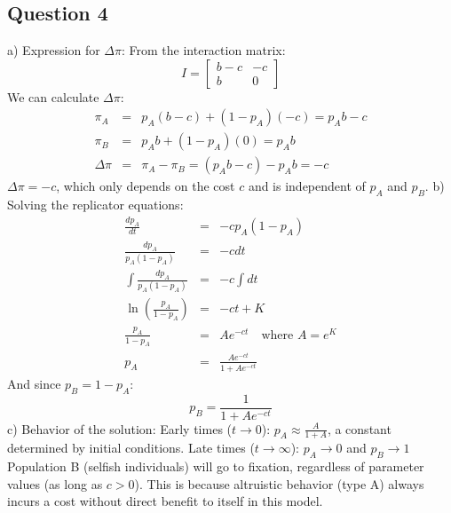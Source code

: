 \documentclass{article}
\begin{document}
\subsection{Question 4}
a) Expression for \(\Delta\pi\):
From the interaction matrix:
\[
I = \begin{bmatrix} b-c & -c \\ b & 0 \end{bmatrix}
\]
We can calculate \(\Delta\pi\):
\[
\begin{array}{rcl}
\pi_A & = & p_A(b-c) + (1-p_A)(-c) = p_A b - c \\
\pi_B & = & p_A b + (1-p_A)(0) = p_A b \\
\Delta\pi & = & \pi_A - \pi_B = (p_A b - c) - p_A b = -c
\end{array}
\]
\(\Delta\pi = -c\), which only depends on the cost \(c\) and is independent of \(p_A\) and \(p_B\).
b) Solving the replicator equations:
\[
\begin{array}{rcl}
\frac{dp_A}{dt} & = & -cp_A(1-p_A) \\
\frac{dp_A}{p_A(1-p_A)} & = & -c dt \\
\int \frac{dp_A}{p_A(1-p_A)} & = & -c \int dt \\
\ln\left(\frac{p_A}{1-p_A}\right) & = & -ct + K \\
\frac{p_A}{1-p_A} & = & Ae^{-ct} \quad \text{where \(A = e^K\)} \\
p_A & = & \frac{Ae^{-ct}}{1+Ae^{-ct}}
\end{array}
\]
And since \(p_B = 1 - p_A\):
\[
p_B = \frac{1}{1+Ae^{-ct}}
\]
c) Behavior of the solution:
Early times (\(t \to 0\)): \(p_A \approx \frac{A}{1+A}\), a constant determined by initial conditions.
Late times (\(t \to \infty\)): \(p_A \to 0\) and \(p_B \to 1\)
Population B (selfish individuals) will go to fixation, regardless of parameter values (as long as \(c > 0\)). This is because altruistic behavior (type A) always incurs a cost without direct benefit to itself in this model.
\end{document}
